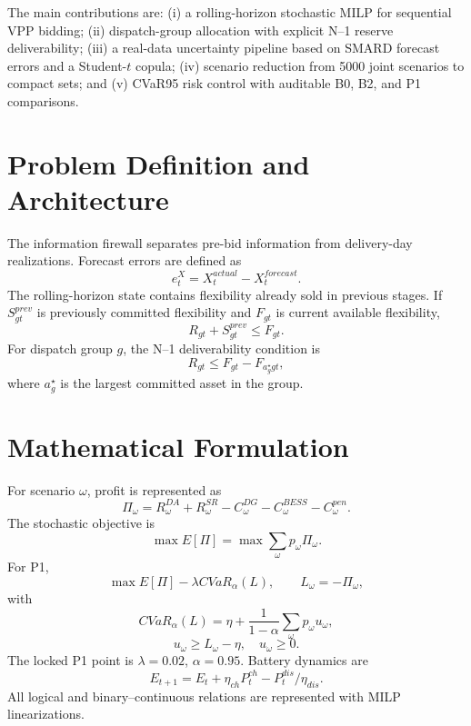 \documentclass[journal]{IEEEtran}
\begin{document}
The main contributions are: (i) a rolling-horizon stochastic MILP for sequential VPP bidding; (ii) dispatch-group allocation with explicit N--1 reserve deliverability; (iii) a real-data uncertainty pipeline based on SMARD forecast errors and a Student-$t$ copula; (iv) scenario reduction from 5000 joint scenarios to compact sets; and (v) CVaR95 risk control with auditable B0, B2, and P1 comparisons.

\section{Problem Definition and Architecture}
The information firewall separates pre-bid information from delivery-day realizations. Forecast errors are defined as
\begin{equation}e^X_t=X^{actual}_t-X^{forecast}_t.\end{equation}
The rolling-horizon state contains flexibility already sold in previous stages. If $S^{prev}_{gt}$ is previously committed flexibility and $F_{gt}$ is current available flexibility,
\begin{equation}R_{gt}+S^{prev}_{gt}\le F_{gt}.\end{equation}
For dispatch group $g$, the N--1 deliverability condition is
\begin{equation}R_{gt}\le F_{gt}-F_{a_g^\star gt},\end{equation}
where $a_g^\star$ is the largest committed asset in the group.

\section{Mathematical Formulation}
For scenario $\omega$, profit is represented as
\begin{equation}\Pi_\omega=R_\omega^{DA}+R_\omega^{SR}-C_\omega^{DG}-C_\omega^{BESS}-C_\omega^{pen}.\end{equation}
The stochastic objective is
\begin{equation}\max E[\Pi]=\max\sum_\omega p_\omega\Pi_\omega.\end{equation}
For P1,
\begin{equation}\max E[\Pi]-\lambda CVaR_\alpha(L),\qquad L_\omega=-\Pi_\omega,
\end{equation}
with
\begin{equation}CVaR_\alpha(L)=\eta+\frac{1}{1-\alpha}\sum_\omega p_\omega u_\omega,\end{equation}
\begin{equation}u_\omega\ge L_\omega-\eta,\quad u_\omega\ge0.\end{equation}
The locked P1 point is $\lambda=0.02$, $\alpha=0.95$. Battery dynamics are
\begin{equation}E_{t+1}=E_t+\eta_{ch}P_t^{ch}-P_t^{dis}/\eta_{dis}.\end{equation}
All logical and binary--continuous relations are represented with MILP linearizations.
\end{document}
